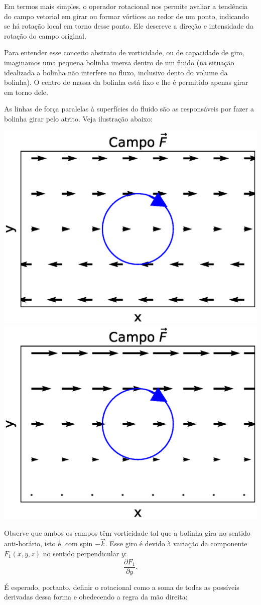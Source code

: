 Em termos mais simples, o operador rotacional nos permite avaliar a tendência do campo vetorial em girar ou formar vórtices ao redor de um ponto, indicando se há rotação local em torno desse ponto. Ele descreve a direção e intensidade da rotação do campo original. 

Para entender esse conceito abstrato de vorticidade, ou de capacidade de giro, imaginamos uma pequena bolinha imersa dentro de um fluido (na situação idealizada a bolinha não interfere no fluxo, inclusivo  dento do volume da bolinha). O centro de massa da bolinha está fixo e lhe é permitido apenas girar em torno dele. 

As linhas de força paralelas à superfícies do fluido são as responsáveis por fazer a bolinha girar pelo atrito. Veja ilustração abaixo:

\begin{center}\includegraphics[width=.5\textwidth]{cap_campos/figs/campo_com_bolinha_rotacional_1}\includegraphics[width=.5\textwidth]{cap_campos/figs/campo_com_bolinha_rotacional_2}\end{center}

Observe que ambos os campos têm vorticidade tal que a bolinha gira no sentido anti-horário, isto é, com spin $-\vec{k}$. Esse giro é devido à variação da componente $F_1(x,y,z)$ no sentido perpendicular $y$:
$$\frac{\partial F_1}{\partial y}. $$

É esperado, portanto, definir o rotacional como a soma de todas as possíveis derivadas dessa forma e obedecendo a regra da mão direita:

